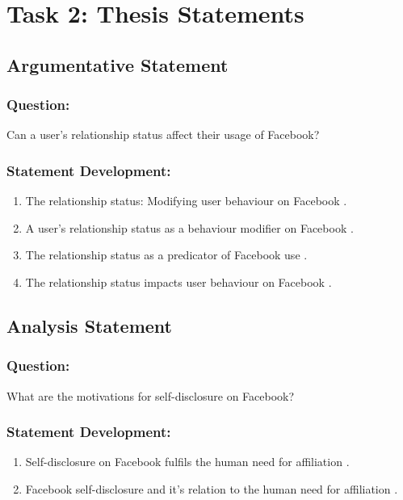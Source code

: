 \documentclass[12pt,a4paper]{report}
\begin{document}
\newpage
\section*{\textsf{Task 2: Thesis Statements}}

\subsection*{\textsf{Argumentative Statement}}

\subsubsection*{\textsf{Question:}}

Can a user's relationship status affect their usage of Facebook?

\subsubsection*{\textsf{Statement Development:}}
\begin{enumerate}
\item The relationship status: Modifying user behaviour on Facebook \citep{McAndrew2012}.
\item A user's relationship status as a behaviour modifier on Facebook \citep{McAndrew2012}.
\item The relationship status as a predicator of Facebook use \citep{McAndrew2012}.
\item The relationship status impacts user behaviour on Facebook \citep{McAndrew2012}.
\end{enumerate}

\subsection*{\textsf{Analysis Statement}}

\subsubsection*{\textsf{Question:}}
What are the motivations for self-disclosure on Facebook?

\subsubsection*{\textsf{Statement Development:}}
\begin{enumerate}
\item Self-disclosure on Facebook fulfils the human need for affiliation \citep{Park2011}.
\item Facebook self-disclosure and it's relation to the human need for affiliation \citep{Park2011}.
\end{enumerate}
\end{document}
